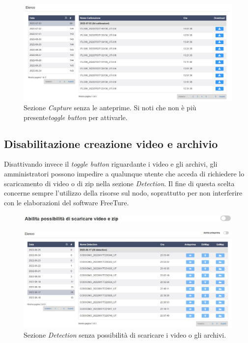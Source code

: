 \begin{figure}[H]
    \includegraphics[width=\textwidth]{images/capture-no-preview.png}
    \caption{Sezione \emph{Capture} senza le anteprime. Si noti che non è più presente\emph{toggle button} per attivarle.}
\end{figure}

\subsection{Disabilitazione creazione video e archivio}

Disattivando invece il \emph{toggle button} riguardante i video e gli archivi, gli amministratori possono impedire a qualunque utente che acceda di richiedere lo scaricamento di video o di zip nella sezione \emph{Detection}. Il fine di questa scelta concerne sempre l'utilizzo della risorse sul nodo, soprattutto per non interferire con le elaborazioni del software FreeTure.

\begin{figure}[H]
    \includegraphics[width=\textwidth]{images/no-download-toggle.jpg}
\end{figure}

\begin{figure}[H]
    \includegraphics[width=\textwidth]{images/detection-no-download.jpg}
    \caption{Sezione \emph{Detection} senza possibilità di scaricare i video o gli archivi.}
\end{figure}

